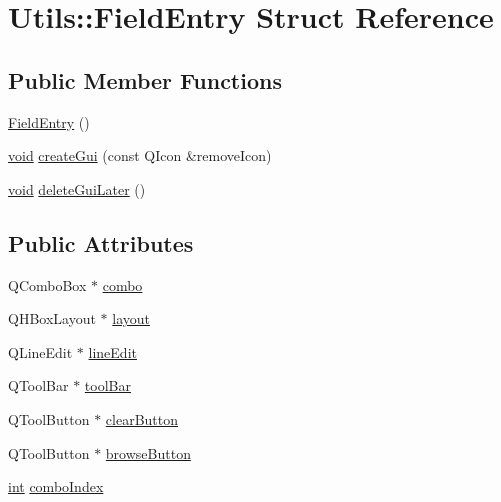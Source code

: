 \hypertarget{struct_utils_1_1_field_entry}{\section{Utils\-:\-:Field\-Entry Struct Reference}
\label{struct_utils_1_1_field_entry}
}
\subsection*{Public Member Functions}
\begin{DoxyCompactItemize}
\item 
\hyperlink{struct_utils_1_1_field_entry_a9cf330695d61003b321b9c01272220a5}{Field\-Entry} ()
\item 
\hyperlink{group___u_a_v_objects_plugin_ga444cf2ff3f0ecbe028adce838d373f5c}{void} \hyperlink{struct_utils_1_1_field_entry_ae95d71da6fc4ffffca5a9231a9dc4e79}{create\-Gui} (const Q\-Icon \&remove\-Icon)
\item 
\hyperlink{group___u_a_v_objects_plugin_ga444cf2ff3f0ecbe028adce838d373f5c}{void} \hyperlink{struct_utils_1_1_field_entry_ab813efd0b5a821f3226b0944f1ceaada}{delete\-Gui\-Later} ()
\end{DoxyCompactItemize}
\subsection*{Public Attributes}
\begin{DoxyCompactItemize}
\item 
Q\-Combo\-Box $\ast$ \hyperlink{struct_utils_1_1_field_entry_abd2511ae13715dedb73f5eacf4228cb2}{combo}
\item 
Q\-H\-Box\-Layout $\ast$ \hyperlink{struct_utils_1_1_field_entry_a1e7b88dcc6013fd6eebdea1d52a0192b}{layout}
\item 
Q\-Line\-Edit $\ast$ \hyperlink{struct_utils_1_1_field_entry_a5fb5e049e448a5e053854ee97ae92e01}{line\-Edit}
\item 
Q\-Tool\-Bar $\ast$ \hyperlink{struct_utils_1_1_field_entry_a87467dace17a68b94a3815c9cbdd4a8c}{tool\-Bar}
\item 
Q\-Tool\-Button $\ast$ \hyperlink{struct_utils_1_1_field_entry_a8926b09838e833b4547f3848df7a243b}{clear\-Button}
\item 
Q\-Tool\-Button $\ast$ \hyperlink{struct_utils_1_1_field_entry_a6183f102a26cf23b3789c436774bb487}{browse\-Button}
\item 
\hyperlink{ioapi_8h_a787fa3cf048117ba7123753c1e74fcd6}{int} \hyperlink{struct_utils_1_1_field_entry_a98cf51959e982fb59e83a1185d5f382b}{combo\-Index}
\end{DoxyCompactItemize}


